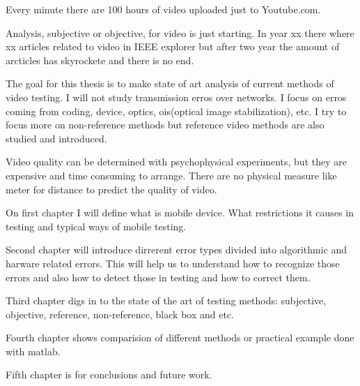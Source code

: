 
Every minute there are 100 hours of video uploaded just to Youtube.com.
~\cite{youtube} 

Analysis, subjective or objective, for video is just starting. In year xx
there where xx articles related to video in IEEE explorer but after two year the amount of
arcticles has skyrockete and there is no end. 

The goal for this thesis is to make state of art analysis of current methods
of video testing. I will not study transmission erros over networks. I focus 
on erros coming from coding, device, optics,
ois(optical image stabilization), etc. I try to focus more on non-reference
methods but reference video methods are also studied and introduced. 

Video quality can be determined with psychophysical experiments, but they are
expensive and time consuming to arrange. There are no physical measure like
meter for distance to predict the quality of video. 

On first chapter I will define what is mobile device. What restrictions it
causes in testing and typical ways of mobile testing.  

Second chapter will introduce dirrerent error types divided into algorithmic
and harware related errors. This will help us to understand how to recognize
those errors and also how to detect those in testing and how to correct them.  

Third chapter digs in to the state of the art of testing methods: 
subjective, objective, reference, non-reference, black box and etc. 

Fourth chapter shows comparision of different methods or practical example
done with matlab. 

Fifth chapter is for conclusions and future work. 
